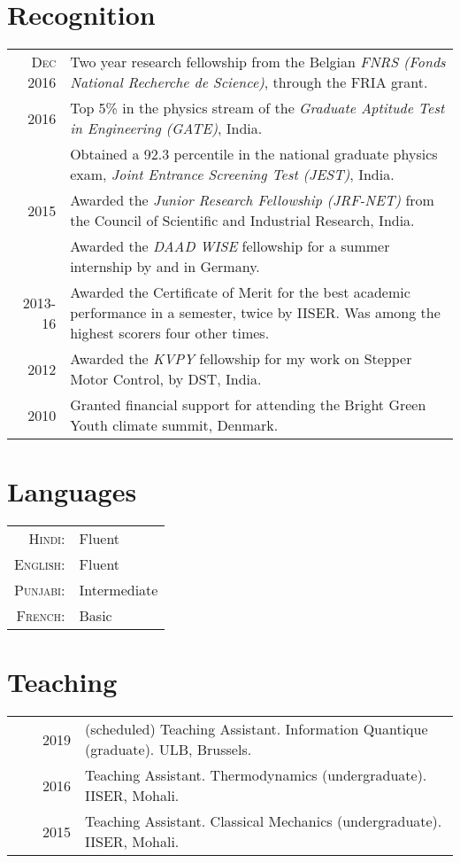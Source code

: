 \documentclass[a4paper,10pt]{article}
\begin{document}
\section{Recognition }
\begin{tabular}{rp{11cm}}
 \textsc{Dec} 2016 & Two year research fellowship from the Belgian \emph{FNRS (Fonds National Recherche de Science)}, through the FRIA grant.\normalsize\\
 2016     & Top 5\% in the physics stream of the \emph{Graduate Aptitude Test in Engineering (GATE)}, India. \\
          & Obtained a 92.3 percentile in the national graduate physics exam, \emph{Joint Entrance Screening Test (JEST)}, India. \\

 2015     & Awarded the \emph{Junior Research Fellowship (JRF-NET)} from the Council of Scientific and Industrial Research, India. \\
          & Awarded the \emph{DAAD WISE} fellowship for a summer internship by and in Germany.\\
 2013-16  & Awarded the Certificate of Merit for the best academic performance in a semester, twice by IISER. Was among the highest scorers four other times.\\
 2012     & Awarded the \emph{KVPY} fellowship for my work on Stepper Motor Control, by DST, India.\\
 2010     & Granted financial support for attending the Bright Green Youth climate summit, Denmark.
\end{tabular}

\section{Languages}
\begin{tabular}{rl}
 \textsc{Hindi:}&Fluent\\
\textsc{English:}&Fluent\\
\textsc{Punjabi:}&Intermediate\\
\textsc{French:}&Basic\\
\end{tabular}

\section{Teaching}
\begin{tabular}{rrp{11cm}}
& ~~2019 &(scheduled) Teaching Assistant. Information Quantique (graduate). ULB, Brussels.\\  
& ~~2016 &Teaching Assistant. Thermodynamics (undergraduate). IISER, Mohali.\\
& ~~2015 &Teaching Assistant. Classical Mechanics (undergraduate). IISER, Mohali.
\end{tabular}
\end{document}
